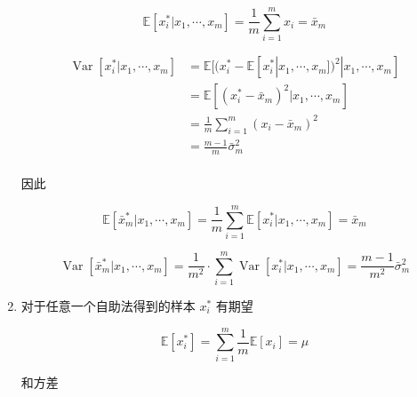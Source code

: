 \documentclass[answers]{exam}  %
\begin{document}
\begin{questions}
\begin{solution}
\begin{enumerate}
            \begin{equation}
              \mathbb{E}[x_i^{*} | x_1, \cdots, x_m] = \frac{1}{m}\sum_{i=1}^{m} x_i = \bar{x}_m
            \end{equation}

            \begin{equation}
              \begin{aligned}
                \operatorname{Var}[x_i^{*} | x_1, \cdots, x_m]
                 & = \mathbb{E}[(x_i^{*} - \mathbb{E}[x_i^{*} | x_1, \cdots, x_m])^{2} | x_1, \cdots, x_m] \\
                 & = \mathbb{E}[(x_i^{*} - \bar{x}_m)^{2} | x_1, \cdots, x_m]                              \\
                 & = \frac{1}{m}\sum_{i=1}^{m} (x_i - \bar{x}_m)^{2}                                   \\
                 & = \frac{m-1}{m}\bar{\sigma}_m^{2}                                                   \\
              \end{aligned}
            \end{equation}

            因此

            \begin{equation}
              \mathbb{E}[\bar{x}_m^{*} | x_1, \cdots, x_m] = \frac{1}{m}\sum_{i=1}^{m} \mathbb{E}[x_i^{*} | x_1, \cdots, x_m] = \bar{x}_m
            \end{equation}

            \begin{equation}
              \operatorname{Var}[\bar{x}_m^{*} | x_1, \cdots, x_m] = \frac{1}{m^{2}} \cdot \sum_{i=1}^{m} \operatorname{Var}[x_i^{*} | x_1, \cdots, x_m] = \frac{m-1}{m^{2}}\bar{\sigma}_m^{2}
            \end{equation}

      \item 对于任意一个自助法得到的样本 $x_i^{*}$ 有期望

            \begin{equation}
              \mathbb{E}[x_i^{*}] = \sum_{i=1}^{m} \frac{1}{m}\mathbb{E}[x_i] = \mu
            \end{equation}

            和方差


\end{enumerate}
\end{solution}
\end{questions}
\end{document}
